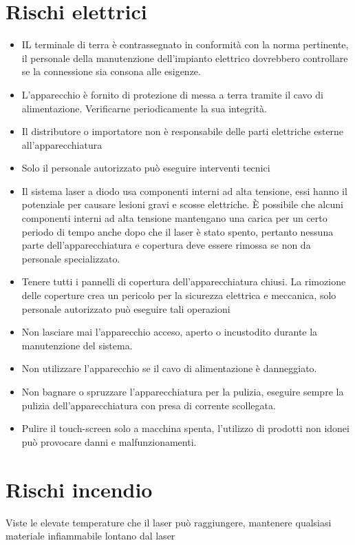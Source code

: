 \documentclass[10pt]{article}
\begin{document}
\section{Rischi elettrici}
\begin{itemize}
  \item IL terminale di terra è contrassegnato in conformità con la norma pertinente, il personale della manutenzione dell'impianto elettrico dovrebbero controllare se la connessione sia consona alle esigenze.
  \item L'apparecchio è fornito di protezione di messa a terra tramite il cavo di alimentazione. Verificarne periodicamente la sua integrità.
  \item Il distributore o importatore non è responsabile delle parti elettriche esterne all'apparecchiatura
  \item Solo il personale autorizzato può eseguire interventi tecnici
  \item Il sistema laser a diodo usa componenti interni ad alta tensione, essi hanno il potenziale per causare lesioni gravi e scosse elettriche. È possibile che alcuni componenti interni ad alta tensione mantengano una carica per un certo periodo di tempo anche dopo che il laser è stato spento, pertanto nessuna parte dell'apparecchiatura e copertura deve essere rimossa se non da personale specializzato.
  \item Tenere tutti i pannelli di copertura dell'apparecchiatura chiusi. La rimozione delle coperture crea un pericolo per la sicurezza elettrica e meccanica, solo personale autorizzato può eseguire tali operazioni
  \item Non lasciare mai l'apparecchio acceso, aperto o incustodito durante la manutenzione del sistema.
  \item Non utilizzare l'apparecchio se il cavo di alimentazione è danneggiato.
  \item Non bagnare o spruzzare l'apparecchiatura per la pulizia, eseguire sempre la pulizia dell'apparecchiatura con presa di corrente scollegata.
  \item Pulire il touch-screen solo a macchina spenta, l'utilizzo di prodotti non idonei può provocare danni e malfunzionamenti.
\end{itemize}

\section{Rischi incendio}
Viste le elevate temperature che il laser può raggiungere, mantenere qualsiasi materiale infiammabile lontano dal laser
\end{document}
